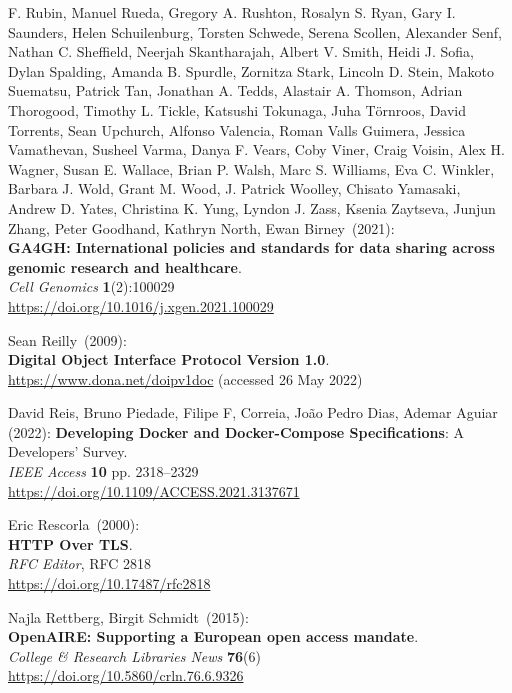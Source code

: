 \begin{thebibliography}{9}
F. Rubin, Manuel Rueda, Gregory A. Rushton, Rosalyn S. Ryan, Gary I.
Saunders, Helen Schuilenburg, Torsten Schwede, Serena Scollen, Alexander
Senf, Nathan C. Sheffield, Neerjah Skantharajah, Albert V. Smith, Heidi
J. Sofia, Dylan Spalding, Amanda B. Spurdle, Zornitza Stark, Lincoln D.
Stein, Makoto Suematsu, Patrick Tan, Jonathan A. Tedds, Alastair A.
Thomson, Adrian Thorogood, Timothy L. Tickle, Katsushi Tokunaga, Juha
Törnroos, David Torrents, Sean Upchurch, Alfonso Valencia, Roman Valls
Guimera, Jessica Vamathevan, Susheel Varma, Danya F. Vears, Coby Viner,
Craig Voisin, Alex H. Wagner, Susan E. Wallace, Brian P. Walsh, Marc S.
Williams, Eva C. Winkler, Barbara J. Wold, Grant M. Wood, J. Patrick
Woolley, Chisato Yamasaki, Andrew D. Yates, Christina K. Yung, Lyndon J.
Zass, Ksenia Zaytseva, Junjun Zhang, Peter Goodhand, Kathryn North, Ewan
Birney~(2021): \\
\textbf{GA4GH: International policies and standards for data sharing
across genomic research and healthcare}.\\
\emph{Cell Genomics} \textbf{1}(2):100029\\
\url{https://doi.org/10.1016/j.xgen.2021.100029}

Sean Reilly~(2009): \\
\textbf{Digital Object Interface Protocol Version 1.0}.\\
\url{https://www.dona.net/doipv1doc} (accessed 26 May 2022)

David Reis, Bruno Piedade, Filipe F, Correia, João Pedro Dias, Ademar Aguiar (2022):
\textbf{Developing Docker and Docker-Compose Specifications}: A Developers’ Survey.\\
\emph{IEEE Access} \textbf{10} pp. 2318--2329 \\
\url{https://doi.org/10.1109/ACCESS.2021.3137671}

Eric Rescorla~(2000): \\
\textbf{HTTP Over TLS}.\\
\emph{RFC Editor}, RFC 2818\\
\url{https://doi.org/10.17487/rfc2818}

Najla Rettberg, Birgit Schmidt~(2015): \\
\textbf{OpenAIRE: Supporting a European open access mandate}.\\
\emph{College \& Research Libraries News} \textbf{76}(6) \\
\url{https://doi.org/10.5860/crln.76.6.9326}


\end{thebibliography}
